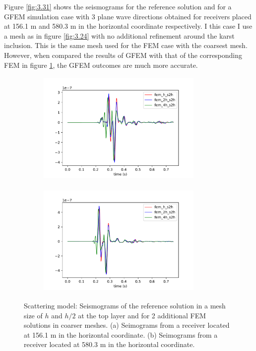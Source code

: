 Figure \ref{fig:3.31} shows the seismograms for the reference solution and for a GFEM simulation case with 3 plane wave directions obtained for receivers placed at 156.1 m and 580.3 m in the horizontal coordinate respectively. I this case I use a mesh as in figure \ref{fig:3.24} with no additional refinement around the karst inclusion. This is the same mesh used for the FEM case with the coarsest mesh. However, when compared the results of GFEM  with that of the corresponding FEM in figure  \ref{fig:3.28}, the GFEM outcomes are much more accurate.


 \begin{figure}[h!]
 		\centering
		\begin{subfigure}{8cm}
				\includegraphics[width=8cm, height=5.5cm]{Thesis_Edith/figures/scattering/scat_waves/fem_scat_tr15.pdf} 
			     \caption{}
		\end{subfigure}
        \hspace{0.25cm}	
		\begin{subfigure}{8cm}
				\includegraphics[width=8cm, height=5.5cm]{Thesis_Edith/figures/scattering/scat_waves/fem_scat_tr75.pdf}
			   \caption{}
		\end{subfigure}
 
	\caption{Scattering model: Seismograms of the reference solution in a mesh size of $h$ and $h/2$ at the top layer and for 2 additional FEM solutions in coarser meshes. (a) Seimograms from a receiver located at 156.1 m in the horizontal coordinate. (b) Seimograms from a receiver located at 580.3 m in the horizontal coordinate.}
	\label{fig:3.28}
\end{figure}

